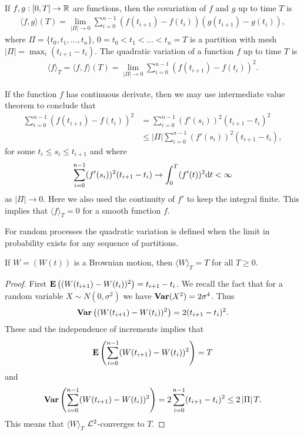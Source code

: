 If $f,g : [0,T] \rightarrow \mathbb{R}$ are functions, then the covariation of $f$ and $g$ up to time $T$ is
  \begin{align}
    \langle f,g \rangle (T) = \lim_{ \left| \Pi \right| \rightarrow 0} \sum_{i=0}^{n-1} (f( t_{i+1} ) - f (t_i) )(g( t_{i+1} ) - g (t_i) ),
  \end{align}
where $\Pi = \{ t_0, t_1, \ldots , t_n \}$, $0 = t_0 < t_1 < \ldots < t_n = T$ is a partition with mesh $\left| \Pi \right| = \max_i ( t_{i+1} - t_{i} ) $. The quadratic variation of a function $f$ up to time $T$ is
  \begin{align}
    \langle f \rangle_T = \langle f,f \rangle (T) = \lim_{ \left| \Pi \right| \rightarrow 0} \sum_{i=0}^{n-1} (f( t_{i+1} ) - f (t_i) )^2.
  \end{align}
  
If the function $f$ has continuous derivate, then we may use intermediate value theorem to conclude that 
  \begin{align}
    \sum_{i=0}^{n-1} (f( t_{i+1} ) - f (t_i) )^2 &= \sum_{i=0}^{n-1} (f'(s_i))^2 (t_{i+1} - t_i)^2 \\
      & \leq \left| \Pi \right| \sum_{i=0}^{n-1} (f'(s_i))^2 (t_{i+1} - t_i),
  \end{align}
for some $t_i \leq s_i \leq t_{i+1}$ and where
  \begin{align}
     \sum_{i=0}^{n-1} (f'(s_i))^2 (t_{i+1} - t_i) \rightarrow \int_0^T (f'(t))^2 \mathrm{d} t < \infty
  \end{align}
as $\left| \Pi \right| \rightarrow 0$. Here we also used the continuity of $f'$ to keep the integral finite. This implies that $\langle f \rangle_T = 0$ for a smooth function $f$.

For random processes the quadratic variation is defined when the limit in probability exists for any sequence of partitions. 

\begin{thm}
If $W= (W(t))$ is a Brownian motion, then $\langle W \rangle_T = T$ for all $T \geq 0$.
\end{thm}

\begin{proof}
First $\operatorname{\boldsymbol{\mathrm{E}}} \left( (W(t_{i+1}) - W(t_i) )^2 \right) = t_{i+1} - t_i$. We recall the fact that for a random variable $ X \sim N(0, \sigma^2)$ we have $\operatorname{\boldsymbol{\mathrm{Var}}} (X^2) = 2 \sigma^4$. Thus 
  \begin{align}
    \operatorname{\boldsymbol{\mathrm{Var}}} \left( (W(t_{i+1}) - W(t_i) )^2 \right) =  2 (t_{i+1} - t_i)^2. 
  \end{align}
These and the independence of increments implies that
  \begin{align}
    \operatorname{\boldsymbol{\mathrm{E}}} \left( \sum_{i=0}^{n-1} (W(t_{i+1}) - W(t_i) )^2 \right) = T
  \end{align}
and
  \begin{align}
    \operatorname{\boldsymbol{\mathrm{Var}}} \left( \sum_{i=0}^{n-1} (W(t_{i+1}) - W(t_i) )^2 \right) = 2 \sum_{i=0}^{n-1} (t_{i+1} - t_i)^2 \leq 2 \left| \Pi \right| T .
  \end{align}
This means that $\langle W \rangle_T$ $\mathcal{L}^2$-converges to $T$.
\end{proof}


